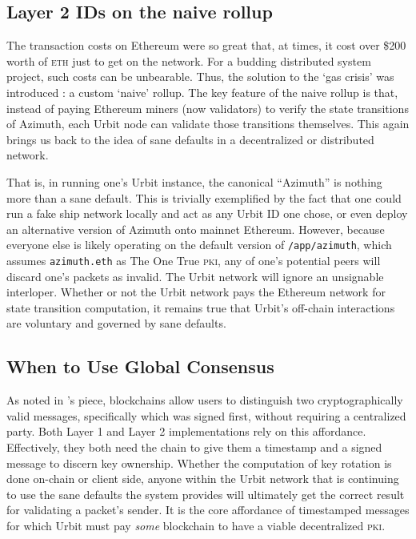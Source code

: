 \documentclass[twoside]{article}
\begin{document}
\subsection{Layer 2 IDs on the naive rollup}

The transaction costs on Ethereum were so great that, at times, it cost over \$200 worth of \textsc{eth} just to get on the network. For a budding distributed system project, such costs can be unbearable. Thus, the solution to the `gas crisis' was introduced \citep{Paprocki2021}: a custom `naive' rollup. The key feature of the naive rollup is that, instead of paying Ethereum miners (now validators) to verify the state transitions of Azimuth, each Urbit node can validate those transitions themselves. This again brings us back to the idea of sane defaults in a decentralized or distributed network. 

That is, in running one's Urbit instance, the canonical ``Azimuth'' is nothing more than a sane default. This is trivially exemplified by the fact that one could run a fake ship network locally and act as any Urbit ID one chose, or even deploy an alternative version of Azimuth onto mainnet Ethereum. However, because everyone else is likely operating on the default version of \lstinline[style=inlinecode]{/app/azimuth}, which assumes \lstinline[style=inlinecode]{azimuth.eth} as The One True \textsc{pki}, any of one's potential peers will discard one's packets as invalid. The Urbit network will ignore an unsignable interloper. Whether or not the Urbit network pays the Ethereum network for state transition computation, it remains true that Urbit's off-chain interactions are voluntary and governed by sane defaults.

\subsection{When to Use Global Consensus}

As noted in 's piece, blockchains allow users to distinguish two cryptographically valid messages, specifically which was signed first, without requiring a centralized party. Both Layer 1 and Layer 2 implementations rely on this affordance. Effectively, they both need the chain to give them a timestamp and a signed message to discern key ownership. Whether the computation of key rotation is done on-chain or client side, anyone within the Urbit network that is continuing to use the sane defaults the system provides will ultimately get the correct result for validating a packet's sender. It is the core affordance of timestamped messages for which Urbit must pay \emph{some} blockchain to have a viable decentralized \textsc{pki}.
\end{document}
